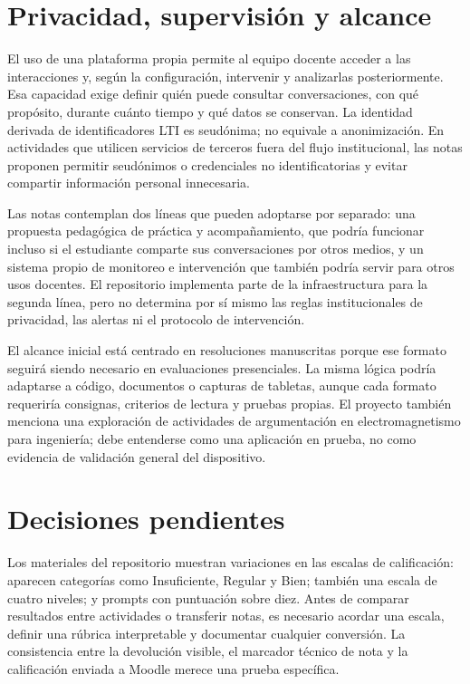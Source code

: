 \documentclass[11pt,a4paper]{article}
\begin{document}
\section{Privacidad, supervisión y alcance}

El uso de una plataforma propia permite al equipo docente acceder a las interacciones y, según la configuración, intervenir y analizarlas posteriormente. Esa capacidad exige definir quién puede consultar conversaciones, con qué propósito, durante cuánto tiempo y qué datos se conservan. La identidad derivada de identificadores LTI es seudónima; no equivale a anonimización. En actividades que utilicen servicios de terceros fuera del flujo institucional, las notas proponen permitir seudónimos o credenciales no identificatorias y evitar compartir información personal innecesaria.

Las notas contemplan dos líneas que pueden adoptarse por separado: una propuesta pedagógica de práctica y acompañamiento, que podría funcionar incluso si el estudiante comparte sus conversaciones por otros medios, y un sistema propio de monitoreo e intervención que también podría servir para otros usos docentes. El repositorio implementa parte de la infraestructura para la segunda línea, pero no determina por sí mismo las reglas institucionales de privacidad, las alertas ni el protocolo de intervención.

El alcance inicial está centrado en resoluciones manuscritas porque ese formato seguirá siendo necesario en evaluaciones presenciales. La misma lógica podría adaptarse a código, documentos o capturas de tabletas, aunque cada formato requeriría consignas, criterios de lectura y pruebas propias. El proyecto también menciona una exploración de actividades de argumentación en electromagnetismo para ingeniería; debe entenderse como una aplicación en prueba, no como evidencia de validación general del dispositivo.

\section{Decisiones pendientes}

Los materiales del repositorio muestran variaciones en las escalas de calificación: aparecen categorías como Insuficiente, Regular y Bien; también una escala de cuatro niveles; y prompts con puntuación sobre diez. Antes de comparar resultados entre actividades o transferir notas, es necesario acordar una escala, definir una rúbrica interpretable y documentar cualquier conversión. La consistencia entre la devolución visible, el marcador técnico de nota y la calificación enviada a Moodle merece una prueba específica.
\end{document}
